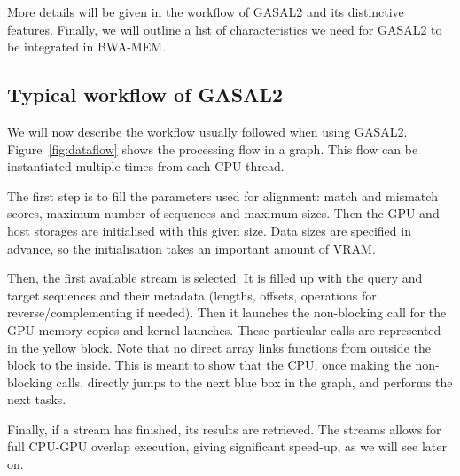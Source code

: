 More details will be given in the workflow of GASAL2 and its distinctive features. Finally, we will outline a list of characteristics we need for GASAL2 to be integrated in BWA-MEM.


\subsection{Typical workflow of GASAL2}

We will now describe the workflow usually followed when using GASAL2. Figure~\ref{fig:dataflow} shows the processing flow in a graph. This flow can be instantiated multiple times from each CPU thread.

The first step is to fill the parameters used for alignment: match and mismatch scores, maximum number of sequences and maximum sizes. Then the GPU and host storages are initialised with this given size. Data sizes are specified in advance, so the initialisation takes an important amount of VRAM.

Then, the first available stream is selected. It is filled up with the query and target sequences and their metadata (lengths, offsets, operations for reverse/complementing if needed). Then it launches the non-blocking call for the GPU memory copies and kernel launches. These particular calls are represented in the yellow block. Note that no direct array links functions from outside the block to the inside. This is meant to show that the CPU, once making the non-blocking calls, directly jumps to the next blue box in the graph, and performs the next tasks.

Finally, if a stream has finished, its results are retrieved. The streams allows for full CPU-GPU overlap execution, giving significant speed-up, as we will see later on.

